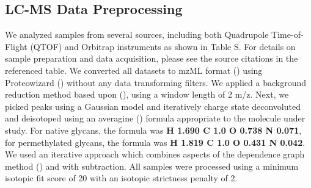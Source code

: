 \subsection{LC-MS Data Preprocessing}
    We analyzed samples from several sources, including both Quadrupole Time-of-Flight (QTOF) and
    Orbitrap instruments as shown in Table S. For details on sample preparation
    and data acquisition, please see the source citations in the referenced table. We converted all
    datasets to mzML format (\citealp{Martens2011}) using Proteowizard (\citealp{Kessner2008}) without
    any data transforming filters. We applied a background reduction method based upon (\citealp{Kaur2006}),
    using a window length of 2 m/z. Next, we picked peaks using a Gaussian model and iteratively charge
    state deconvoluted and deisotoped using an averagine (\citealp{Senko1995}) formula appropriate to the
    molecule under study. For native glycans, the formula was \textbf{H 1.690 C 1.0 O 0.738 N 0.071},
    for permethylated glycans, the formula was \textbf{H 1.819 C 1.0 O 0.431 N 0.042}. We used an iterative
    approach which combines aspects of the dependence graph method (\citealp{Liu2010}) and with subtraction.
    All samples were processed using a minimum isotopic fit score of 20 with an isotopic strictness penalty
    of 2.

